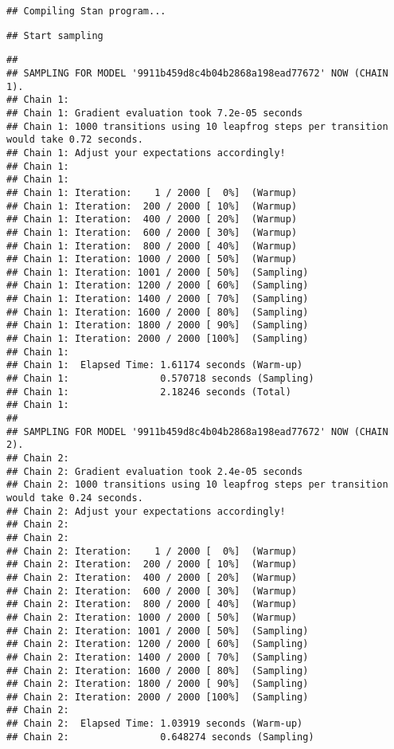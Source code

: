 \documentclass[
]{book}
\begin{document}
\begin{verbatim}
## Compiling Stan program...
\end{verbatim}

\begin{verbatim}
## Start sampling
\end{verbatim}

\begin{verbatim}
## 
## SAMPLING FOR MODEL '9911b459d8c4b04b2868a198ead77672' NOW (CHAIN 1).
## Chain 1: 
## Chain 1: Gradient evaluation took 7.2e-05 seconds
## Chain 1: 1000 transitions using 10 leapfrog steps per transition would take 0.72 seconds.
## Chain 1: Adjust your expectations accordingly!
## Chain 1: 
## Chain 1: 
## Chain 1: Iteration:    1 / 2000 [  0%]  (Warmup)
## Chain 1: Iteration:  200 / 2000 [ 10%]  (Warmup)
## Chain 1: Iteration:  400 / 2000 [ 20%]  (Warmup)
## Chain 1: Iteration:  600 / 2000 [ 30%]  (Warmup)
## Chain 1: Iteration:  800 / 2000 [ 40%]  (Warmup)
## Chain 1: Iteration: 1000 / 2000 [ 50%]  (Warmup)
## Chain 1: Iteration: 1001 / 2000 [ 50%]  (Sampling)
## Chain 1: Iteration: 1200 / 2000 [ 60%]  (Sampling)
## Chain 1: Iteration: 1400 / 2000 [ 70%]  (Sampling)
## Chain 1: Iteration: 1600 / 2000 [ 80%]  (Sampling)
## Chain 1: Iteration: 1800 / 2000 [ 90%]  (Sampling)
## Chain 1: Iteration: 2000 / 2000 [100%]  (Sampling)
## Chain 1: 
## Chain 1:  Elapsed Time: 1.61174 seconds (Warm-up)
## Chain 1:                0.570718 seconds (Sampling)
## Chain 1:                2.18246 seconds (Total)
## Chain 1: 
## 
## SAMPLING FOR MODEL '9911b459d8c4b04b2868a198ead77672' NOW (CHAIN 2).
## Chain 2: 
## Chain 2: Gradient evaluation took 2.4e-05 seconds
## Chain 2: 1000 transitions using 10 leapfrog steps per transition would take 0.24 seconds.
## Chain 2: Adjust your expectations accordingly!
## Chain 2: 
## Chain 2: 
## Chain 2: Iteration:    1 / 2000 [  0%]  (Warmup)
## Chain 2: Iteration:  200 / 2000 [ 10%]  (Warmup)
## Chain 2: Iteration:  400 / 2000 [ 20%]  (Warmup)
## Chain 2: Iteration:  600 / 2000 [ 30%]  (Warmup)
## Chain 2: Iteration:  800 / 2000 [ 40%]  (Warmup)
## Chain 2: Iteration: 1000 / 2000 [ 50%]  (Warmup)
## Chain 2: Iteration: 1001 / 2000 [ 50%]  (Sampling)
## Chain 2: Iteration: 1200 / 2000 [ 60%]  (Sampling)
## Chain 2: Iteration: 1400 / 2000 [ 70%]  (Sampling)
## Chain 2: Iteration: 1600 / 2000 [ 80%]  (Sampling)
## Chain 2: Iteration: 1800 / 2000 [ 90%]  (Sampling)
## Chain 2: Iteration: 2000 / 2000 [100%]  (Sampling)
## Chain 2: 
## Chain 2:  Elapsed Time: 1.03919 seconds (Warm-up)
## Chain 2:                0.648274 seconds (Sampling)

\end{verbatim}
\end{document}
